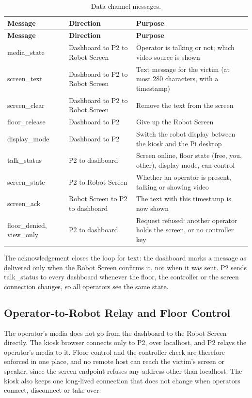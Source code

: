\begin{center}
\begin{longtable}{|p{3cm}|p{3.5cm}|p{5cm}|}
\caption{Data channel messages.}
\label{tab:data-channel} \\
\hline
\textbf{Message} & \textbf{Direction} & \textbf{Purpose} \\
\hline
\endfirsthead
\hline
\textbf{Message} & \textbf{Direction} & \textbf{Purpose} \\
\hline
\endhead
media\_state & Dashboard to P2 to Robot Screen & Operator is talking or not; which video source is shown \\
\hline
screen\_text & Dashboard to P2 to Robot Screen & Text message for the victim (at most 280 characters, with a timestamp) \\
\hline
screen\_clear & Dashboard to P2 to Robot Screen & Remove the text from the screen \\
\hline
floor\_release & Dashboard to P2 & Give up the Robot Screen \\
\hline
display\_mode & Dashboard to P2 & Switch the robot display between the kiosk and the Pi desktop \\
\hline
talk\_status & P2 to dashboard & Screen online, floor state (free, you, other), display mode, can control \\
\hline
screen\_state & P2 to Robot Screen & Whether an operator is present, talking or showing video \\
\hline
screen\_ack & Robot Screen to P2 to dashboard & The text with this timestamp is now shown \\
\hline
floor\_denied, view\_only & P2 to dashboard & Request refused: another operator holds the screen, or no controller key \\
\hline
\end{longtable}
\end{center}

The acknowledgement closes the loop for text: the dashboard marks a message as delivered only when the Robot Screen confirms it, not when it was sent. P2 sends talk\_status to every dashboard whenever the floor, the controller or the screen connection changes, so all operators see the same state.

\subsection{Operator-to-Robot Relay and Floor Control}

The operator's media does not go from the dashboard to the Robot Screen directly. The kiosk browser connects only to P2, over localhost, and P2 relays the operator's media to it. Floor control and the controller check are therefore enforced in one place, and no remote host can reach the victim's screen or speaker, since the screen endpoint refuses any address other than localhost. The kiosk also keeps one long-lived connection that does not change when operators connect, disconnect or take over.

